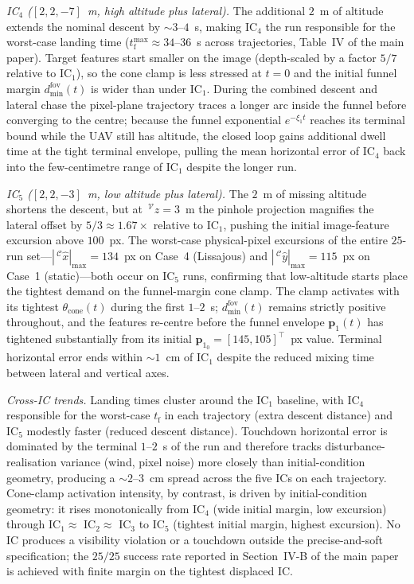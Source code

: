 \documentclass[10pt,journal]{IEEEtran}
\begin{document}
\emph{IC$_4$ ($[2,2,-7]$~m, high altitude plus lateral).} The additional $2$~m of altitude extends the nominal descent by $\sim 3$--$4$~s, making IC$_4$ the run responsible for the worst-case landing time ($t_\text{f}^{\max}\approx 34$--$36$~s across trajectories, Table~IV of the main paper). Target features start smaller on the image (depth-scaled by a factor $5/7$ relative to IC$_1$), so the cone clamp is less stressed at $t=0$ and the initial funnel margin $d_\text{min}^\text{fov}(t)$ is wider than under IC$_1$. During the combined descent and lateral chase the pixel-plane trajectory traces a longer arc inside the funnel before converging to the centre; because the funnel exponential $e^{-\xi_1 t}$ reaches its terminal bound while the UAV still has altitude, the closed loop gains additional dwell time at the tight terminal envelope, pulling the mean horizontal error of IC$_4$ back into the few-centimetre range of IC$_1$ despite the longer run.

\emph{IC$_5$ ($[2,2,-3]$~m, low altitude plus lateral).} The $2$~m of missing altitude shortens the descent, but at $\,^\mathcal{V}z=3$~m the pinhole projection magnifies the lateral offset by $5/3\approx 1.67\times$ relative to IC$_1$, pushing the initial image-feature excursion above $100$~px. The worst-case physical-pixel excursions of the entire $25$-run set---$|\,^\mathcal{C}\hat{x}|_{\max}=134$~px on Case~4 (Lissajous) and $|\,^\mathcal{C}\hat{y}|_{\max}=115$~px on Case~1 (static)---both occur on IC$_5$ runs, confirming that low-altitude starts place the tightest demand on the funnel-margin cone clamp. The clamp activates with its tightest $\theta_\text{cone}(t)$ during the first $1$--$2$~s; $d_\text{min}^\text{fov}(t)$ remains strictly positive throughout, and the features re-centre before the funnel envelope $\boldsymbol{p}_1(t)$ has tightened substantially from its initial $\boldsymbol{p}_{1_0}=[145,105]^\top$~px value. Terminal horizontal error ends within $\sim 1$~cm of IC$_1$ despite the reduced mixing time between lateral and vertical axes.

\emph{Cross-IC trends.} Landing times cluster around the IC$_1$ baseline, with IC$_4$ responsible for the worst-case $t_\text{f}$ in each trajectory (extra descent distance) and IC$_5$ modestly faster (reduced descent distance). Touchdown horizontal error is dominated by the terminal $1$--$2$~s of the run and therefore tracks disturbance-realisation variance (wind, pixel noise) more closely than initial-condition geometry, producing a $\sim 2$--$3$~cm spread across the five ICs on each trajectory. Cone-clamp activation intensity, by contrast, is driven by initial-condition geometry: it rises monotonically from IC$_4$ (wide initial margin, low excursion) through IC$_1\approx$ IC$_2\approx$ IC$_3$ to IC$_5$ (tightest initial margin, highest excursion). No IC produces a visibility violation or a touchdown outside the precise-and-soft specification; the $25/25$ success rate reported in Section~IV-B of the main paper is achieved with finite margin on the tightest displaced IC.
\end{document}
